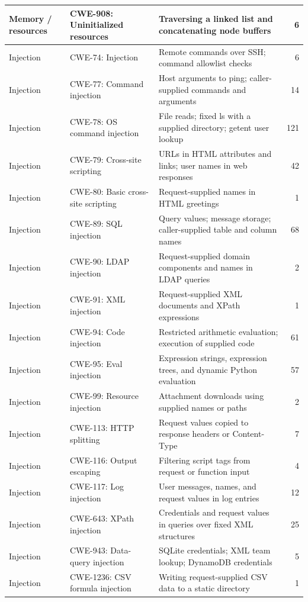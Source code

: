 \begin{longtable}{@{}>{\raggedright\arraybackslash}p{.13\linewidth} >{\raggedright\arraybackslash}p{.25\linewidth} >{\raggedright\arraybackslash}p{} r@{}}
Memory / resources & CWE-908: Uninitialized resources & Traversing a linked list and concatenating node buffers & 6 \\
\midrule
Injection & CWE-74: Injection & Remote commands over SSH; command allowlist checks & 6 \\
Injection & CWE-77: Command injection & Host arguments to ping; caller-supplied commands and arguments & 14 \\
Injection & CWE-78: OS command injection & File reads; fixed ls with a supplied directory; getent user lookup & 121 \\
Injection & CWE-79: Cross-site scripting & URLs in HTML attributes and links; user names in web responses & 42 \\
Injection & CWE-80: Basic cross-site scripting & Request-supplied names in HTML greetings & 1 \\
Injection & CWE-89: SQL injection & Query values; message storage; caller-supplied table and column names & 68 \\
Injection & CWE-90: LDAP injection & Request-supplied domain components and names in LDAP queries & 2 \\
Injection & CWE-91: XML injection & Request-supplied XML documents and XPath expressions & 1 \\
Injection & CWE-94: Code injection & Restricted arithmetic evaluation; execution of supplied code & 61 \\
Injection & CWE-95: Eval injection & Expression strings, expression trees, and dynamic Python evaluation & 57 \\
Injection & CWE-99: Resource injection & Attachment downloads using supplied names or paths & 2 \\
Injection & CWE-113: HTTP splitting & Request values copied to response headers or Content-Type & 7 \\
Injection & CWE-116: Output escaping & Filtering script tags from request or function input & 4 \\
Injection & CWE-117: Log injection & User messages, names, and request values in log entries & 12 \\
Injection & CWE-643: XPath injection & Credentials and request values in queries over fixed XML structures & 25 \\
Injection & CWE-943: Data-query injection & SQLite credentials; XML team lookup; DynamoDB credentials & 5 \\
Injection & CWE-1236: CSV formula injection & Writing request-supplied CSV data to a static directory & 1 \\

\end{longtable}
